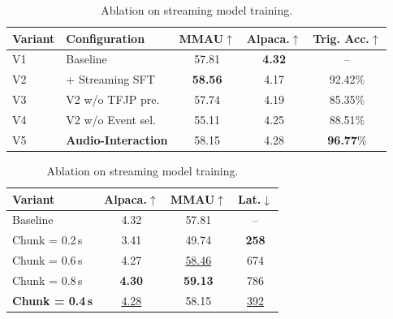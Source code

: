 \documentclass{llmxive}
\providecommand{\arraystretch}{1.0}
\begin{document}
\begin{table}[t]
\centering
\small
\begin{minipage}[t]{0.57\textwidth}
\centering
\setlength{\tabcolsep}{2pt}
\renewcommand{\arraystretch}{0.85}
\begin{tabular}{@{}llccc@{}}
\toprule
\textbf{Variant} & \textbf{Configuration} & \textbf{MMAU}$\uparrow$ & \textbf{Alpaca.}$\uparrow$ & \textbf{Trig. Acc.}$\uparrow$ \\
\midrule
V1 & Baseline       & 57.81 & \textbf{4.32} & --  \\
\midrule
\rowcolor{gray!15}
V2 & + Streaming SFT         & \textbf{58.56} & 4.17 & 92.42\%  \\
V3 & V2 w/o TFJP pre.        & 57.74 & 4.19 & 85.35\% \\
V4 & V2 w/o Event sel.       & 55.11 & 4.25 & 88.51\% \\
\midrule
\rowcolor{gray!15}
V5 & \textbf{Audio-Interaction} & 58.15 & 4.28 & \textbf{96.77}\% \\
\bottomrule
\end{tabular}
\end{minipage}
\hfill
\begin{minipage}[t]{0.39\textwidth}
\centering
\setlength{\tabcolsep}{2pt}
\renewcommand{\arraystretch}{0.85}
\caption{Effect of chunk size.}
\label{tab:ablation_chunk}
\begin{tabular}{@{}lccc@{}}
\toprule
\textbf{Variant} & \textbf{Alpaca.}$\uparrow$ & \textbf{MMAU}$\uparrow$ & \textbf{Lat.}$\downarrow$ \\
\midrule
Baseline             & 4.32 & 57.81 & -- \\
\midrule
Chunk = 0.2\,s       & 3.41 & 49.74 & \textbf{258} \\
Chunk = 0.6\,s       & 4.27 & \underline{58.46} & 674 \\
Chunk = 0.8\,s       & \textbf{4.30} & \textbf{59.13} & 786 \\
\midrule
\rowcolor{gray!15}
\textbf{Chunk = 0.4\,s} & \underline{4.28} & 58.15 & \underline{392} \\
\bottomrule
\end{tabular}
\end{minipage}
\vspace{-3mm}
\caption{Ablation on streaming model training.}
\label{tab:ablation_data}
\end{table}


\end{document}

